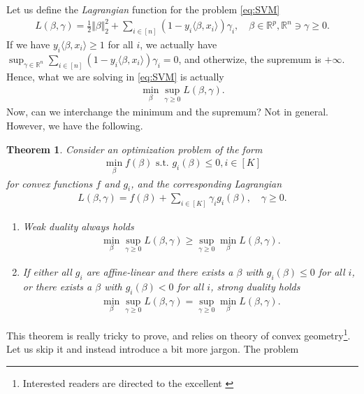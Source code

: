 \documentclass{article}
\newcommand{\sprod}[1]{\langle #1 \rangle}
\newcommand{\R}{\mathbb{R}}
\newtheorem{theorem}{Theorem}
\newcommand{\norm}[1]{\Vert #1 \Vert}
\begin{document}
Let us define the  \emph{Lagrangian} function for the problem \eqref{eq:SVM}
\begin{align*}
    L(\beta, \gamma) = \tfrac{1}{2}\norm{\beta}_2^2 + \sum_{i\in [n]}(1-y_i\sprod{\beta,x_i})\gamma_i, \quad \beta \in \R^p, \R^n \ni \gamma \geq 0.
\end{align*}
If we have $y_i\sprod{\beta,x_i}\geq 1$ for all $i$, we actually have $\sup_{\gamma \in \R^n} \sum_{i\in [n]}(1-y_i\sprod{\beta,x_i})\gamma_i =0$, and otherwize, the supremum is $+\infty$. Hence, what we are solving in \eqref{eq:SVM} is actually
\begin{align*}
    \min_{\beta}\sup_{\gamma\geq 0} L(\beta,\gamma).
\end{align*}
Now, can we interchange the minimum and the supremum? Not in general. However, we have the following.
\begin{theorem}
    Consider an optimization problem of the form
    \begin{align*}
        \min_{\beta} f(\beta) \text{ s.t. } g_i(\beta) \leq 0, i\in [K]
    \end{align*}
    for convex functions $f$ and $g_i$, and the corresponding Lagrangian
    \begin{align*}
        L(\beta,\gamma) = f(\beta) + \sum_{i \in [K]}\gamma_i g_i(\beta), \quad  \gamma \geq 0.
    \end{align*}
    \begin{enumerate}
        \item \emph{Weak duality} always holds
        \begin{align*}
            \min_\beta \sup_{\gamma \geq 0} L(\beta,\gamma) \geq \sup_{\gamma\geq 0 }\min_{\beta} L(\beta,\gamma).
        \end{align*}
        \item If either all $g_i$ are affine-linear and there exists a $\beta$ with $g_i(\beta)\leq 0$ for all $i$, \emph{or} there exists a $\beta$ with $g_i(\beta)<0$ for all $i$, \emph{strong duality} holds
        \begin{align*}
            \min_\beta \sup_{\gamma \geq 0} L(\beta,\gamma) = \sup_{\gamma\geq 0}\min_{\beta} L(\beta,\gamma).
        \end{align*}
    \end{enumerate}
\end{theorem}
This theorem is really tricky to prove, and relies on theory of convex geometry\footnote{Interested readers are directed to the excellent \cite{boyd2004convex}}. Let us skip it and instead introduce a bit more jargon. The  problem
\end{document}

